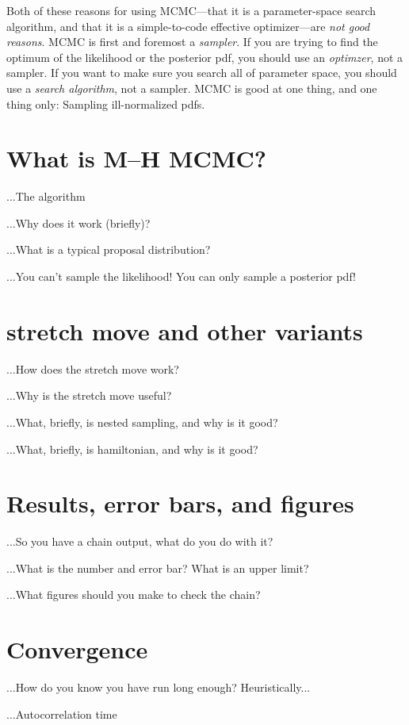 \documentclass[12pt,twoside,pdftex]{article}
\begin{document}
Both of these reasons for using MCMC---that it is a parameter-space
search algorithm, and that it is a simple-to-code effective
optimizer---are \emph{not good reasons}.  MCMC is first and foremost a
\emph{sampler}.  If you are trying to find the optimum of the
likelihood or the posterior pdf, you should use an \emph{optimzer},
not a sampler.  If you want to make sure you search all of parameter
space, you should use a \emph{search algorithm}, not a sampler.  MCMC
is good at one thing, and one thing only: Sampling ill-normalized
pdfs.

\section{What is M--H MCMC?}

...The algorithm

...Why does it work (briefly)?

...What is a typical proposal distribution?

...You can't sample the likelihood!  You can only sample a posterior
pdf!

\section{stretch move and other variants}

...How does the stretch move work?

...Why is the stretch move useful?

...What, briefly, is nested sampling, and why is it good?

...What, briefly, is hamiltonian, and why is it good?

\section{Results, error bars, and figures}

...So you have a chain output, what do you do with it?

...What is the number and error bar?  What is an upper limit?

...What figures should you make to check the chain?

\section{Convergence}

...How do you know you have run long enough?  Heuristically...

...Autocorrelation time
\end{document}
